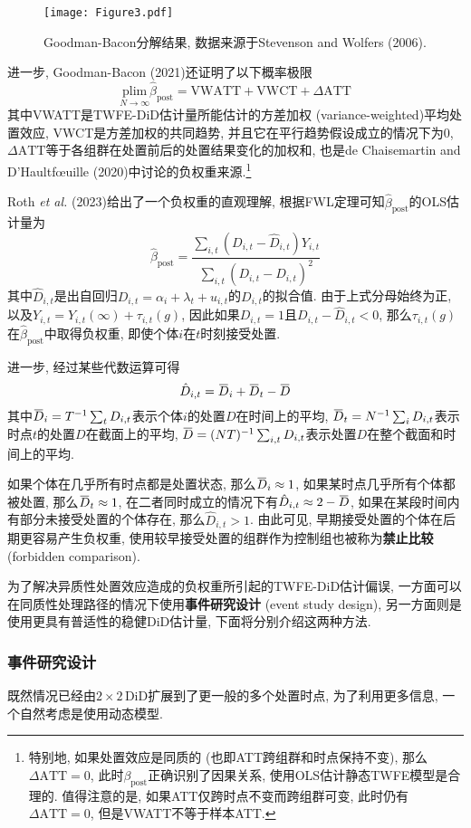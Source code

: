 \documentclass[cn,blue,14pt,screen,bibstyle=gb7714-2015]{elegantnote}
\newcommand{\overbar}[1]{\mkern 1.5mu\overline{\mkern-1.5mu#1\mkern-1.5mu}\mkern 1.5mu}
\begin{document}
\begin{figure}
  \centering
  \texttt{[image: Figure3.pdf]}
  \caption{Goodman-Bacon分解结果, 数据来源于Stevenson and Wolfers (2006).}\label{Figure3}
\end{figure}

进一步, Goodman-Bacon (2021)还证明了以下概率极限
$$\underset{N\to\infty}{\text{plim}}\hat{\beta}_\text{post}=\text{VWATT}+\text{VWCT}+\Delta \text{ATT}$$
其中VWATT是TWFE-DiD估计量所能估计的方差加权 (variance-weighted)平均处置效应, VWCT是方差加权的共同趋势, 并且它在平行趋势假设成立的情况下为0, $\Delta \text{ATT}$等于各组群在处置前后的处置结果变化的加权和, 也是de Chaisemartin and D'Haultfœuille (2020)中讨论的负权重来源.\footnote{特别地, 如果处置效应是同质的 (也即ATT跨组群和时点保持不变), 那么$\Delta\text{ATT}=0$, 此时$\beta_\text{post}$正确识别了因果关系, 使用OLS估计静态TWFE模型是合理的. 值得注意的是, 如果ATT仅跨时点不变而跨组群可变, 此时仍有$\Delta\text{ATT}=0$, 但是VWATT不等于样本ATT.}

Roth \emph{et al.} (2023)给出了一个负权重的直观理解, 根据FWL定理可知$\hat{\beta}_{\text{post}}$的OLS估计量为
$$\hat{\beta}_\text{post}=\frac{\sum_{i,t}(D_{i,t}-\hat{D}_{i,t})Y_{i,t}}{\sum_{i,t}(D_{i,t}-\hat{D}_{i,t})^2}$$
其中$\hat{D}_{i,t}$是出自回归$D_{i,t}=\alpha_i+\lambda_t+u_{i,t}$的$D_{i,t}$的拟合值. 由于上式分母始终为正, 以及$Y_{i,t}=Y_{i,t}(\infty)+\tau_{i,t}(g)$, 因此如果$D_{i,t}=1$且$D_{i,t}-\hat{D}_{i,t}<0$, 那么$\tau_{i,t}(g)$在$\hat{\beta}_\text{post}$中取得负权重, 即使个体$i$在$t$时刻接受处置.

进一步, 经过某些代数运算可得
$$\hat{D}_{i,t}=\overbar{D}_i+\overbar{D}_t-\overbar{D}$$
其中$\overbar{D}_i=T^{-1}\sum_t D_{i,t}$表示个体$i$的处置$D$在时间上的平均, $\overbar{D}_t=N^{-1}\sum_i D_{i,t}$表示时点$t$的处置$D$在截面上的平均, $\overbar{D}=(NT)^{-1}\sum_{i,t}D_{i,t}$表示处置$D$在整个截面和时间上的平均.

如果个体在几乎所有时点都是处置状态, 那么$\overbar{D}_i\approx 1$, 如果某时点几乎所有个体都被处置, 那么$\overbar{D}_t\approx 1$, 在二者同时成立的情况下有$\hat{D}_{i,t}\approx 2-\overbar{D}$, 如果在某段时间内有部分未接受处置的个体存在, 那么$\hat{D}_{i,t}>1$. 由此可见, 早期接受处置的个体在后期更容易产生负权重, 使用较早接受处置的组群作为控制组也被称为\textbf{禁止比较} (forbidden comparison).

为了解决异质性处置效应造成的负权重所引起的TWFE-DiD估计偏误, 一方面可以在同质性处理路径的情况下使用\textbf{事件研究设计} (event study design), 另一方面则是使用更具有普适性的稳健DiD估计量, 下面将分别介绍这两种方法.
\subsubsection{事件研究设计}
既然情况已经由$2\times 2\,$DiD扩展到了更一般的多个处置时点, 为了利用更多信息, 一个自然考虑是使用动态模型.
\end{document}
